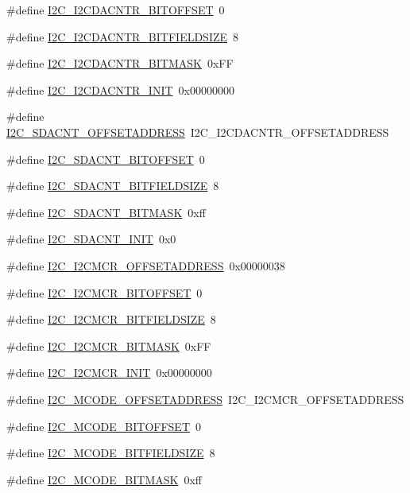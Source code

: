 \begin{DoxyCompactItemize}
\item 
\#define \hyperlink{a00558_a8a699129a4ad89c14f2ce6a05f9e5fd4}{I2C\_\-I2CDACNTR\_\-BITOFFSET}~0
\item 
\#define \hyperlink{a00558_aacf79a0093235b7f25a673b39eb489b7}{I2C\_\-I2CDACNTR\_\-BITFIELDSIZE}~8
\item 
\#define \hyperlink{a00558_a78691e1166babd1c5ba9faa2f7f2a881}{I2C\_\-I2CDACNTR\_\-BITMASK}~0xFF
\item 
\#define \hyperlink{a00558_a2796c4156e07d98303c68dce6646f043}{I2C\_\-I2CDACNTR\_\-INIT}~0x00000000
\item 
\#define \hyperlink{a00558_a52ed411f47eddd567b59b586f53f5baf}{I2C\_\-SDACNT\_\-OFFSETADDRESS}~I2C\_\-I2CDACNTR\_\-OFFSETADDRESS
\item 
\#define \hyperlink{a00558_a779505c1b224579dc95d705c41ffa468}{I2C\_\-SDACNT\_\-BITOFFSET}~0
\item 
\#define \hyperlink{a00558_acf0200b09d20b7746674e7951f0fa3d8}{I2C\_\-SDACNT\_\-BITFIELDSIZE}~8
\item 
\#define \hyperlink{a00558_aab1926caecb04bb69a177f0e4c88cf61}{I2C\_\-SDACNT\_\-BITMASK}~0xff
\item 
\#define \hyperlink{a00558_a5be27e9e2ebe7802057c8b0e3a545a0e}{I2C\_\-SDACNT\_\-INIT}~0x0
\item 
\#define \hyperlink{a00558_a7c8d88c13df3cf38f1ce4a66bae7abb4}{I2C\_\-I2CMCR\_\-OFFSETADDRESS}~0x00000038
\item 
\#define \hyperlink{a00558_ad2fc1819bbd098e1ed0b428feb503939}{I2C\_\-I2CMCR\_\-BITOFFSET}~0
\item 
\#define \hyperlink{a00558_a4adb9cde9ded51c176368ce5b38a4d69}{I2C\_\-I2CMCR\_\-BITFIELDSIZE}~8
\item 
\#define \hyperlink{a00558_aa4c89c242e87e88061e58f6a9aa5d545}{I2C\_\-I2CMCR\_\-BITMASK}~0xFF
\item 
\#define \hyperlink{a00558_a619479ba7fc7ed7ca7f09d41a08fec86}{I2C\_\-I2CMCR\_\-INIT}~0x00000000
\item 
\#define \hyperlink{a00558_ad32b34f7cf59bd26528948fa6e0b004c}{I2C\_\-MCODE\_\-OFFSETADDRESS}~I2C\_\-I2CMCR\_\-OFFSETADDRESS
\item 
\#define \hyperlink{a00558_a9b32763594e0035825f8a261bb29482d}{I2C\_\-MCODE\_\-BITOFFSET}~0
\item 
\#define \hyperlink{a00558_ae88d185c49c342a7afd4f34ebbf85e66}{I2C\_\-MCODE\_\-BITFIELDSIZE}~8
\item 
\#define \hyperlink{a00558_acbfaaee85e30a86dfaa72842b8e4f54a}{I2C\_\-MCODE\_\-BITMASK}~0xff

\end{DoxyCompactItemize}

